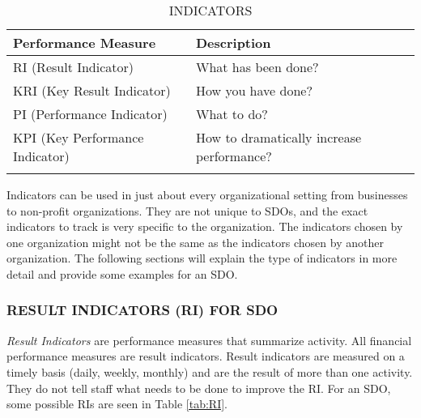 \documentclass[SDSUThesis.tex]{subfiles}
\begin{document}
        \begin{longtable}{@{}l l}
            \toprule%
             \centering%
             {\bfseries Performance Measure}
             & {\bfseries Description}\\
            
            \cmidrule[0.4pt](r{0.125em}){1-1}%
            \cmidrule[0.4pt](lr{0.125em}){2-2}%
            \endhead
            
            RI (Result Indicator) & What has been done?   \\
            \myrowcolour%
            KRI (Key Result Indicator) & How you have done? \\
            PI (Performance Indicator) & What to do? \\
            \myrowcolour%
            KPI (Key Performance Indicator) & How to dramatically increase performance? \\
            
            \bottomrule
            
            \caption{INDICATORS}
            \label{tab:indicators}
        \end{longtable}
            
        Indicators can be used in just about every organizational
        setting from businesses to non-profit organizations. They
        are not unique to SDOs, and the exact indicators to track
        is very specific to the organization.  The indicators chosen
        by one organization might not be the same as the indicators
        chosen by another organization.  The following sections
        will explain the type of indicators in more detail and provide
        some examples for an SDO.
        
        \subsubsection{RESULT INDICATORS (RI) FOR SDO}
            \textit{Result Indicators} are performance 
            measures that summarize activity.  All financial performance
            measures are result indicators.  Result indicators
            are measured on a timely basis (daily, weekly, monthly)
            and are the result of more than one activity.  They do not
            tell staff what needs to be done to improve the RI. For
            an SDO, some possible RIs are seen in Table \ref{tab:RI}.
            
\end{document}
